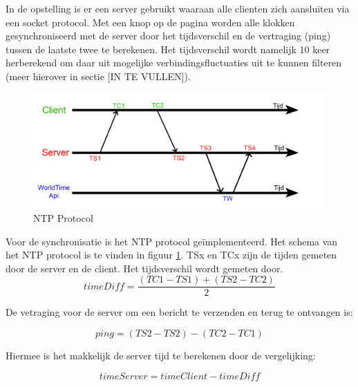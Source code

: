 In de opstelling is er een server gebruikt waaraan alle clienten zich aansluiten via een socket protocol. Met een knop op de pagina worden alle klokken gesynchroniseerd met de server door het tijdsverschil en de vertraging (ping) tussen de laatste twee te berekenen.
Het tijdsverschil wordt namelijk 10 keer herberekend om daar uit mogelijke verbindingsfluctuaties uit te kunnen filteren (meer hierover in sectie [IN TE VULLEN]).

\begin{figure}[h]
\centering
\includegraphics[scale=0.4]{img/server-client-sync.jpg}
\caption{NTP Protocol} \label{serv-client}
\end{figure}

Voor de synchronisatie is het NTP protocol geïmplementeerd. 
Het schema van het NTP protocol is te vinden in figuur \ref{serv-client}. TSx en TCx zijn de tijden gemeten door de server en de client.
Het tijdsverschil wordt gemeten door.
\newline
\[ timeDiff = \frac{(TC1 - TS1) + (TS2 - TC2)}{2}  \]

De vetraging voor de server om een bericht te verzenden en terug te ontvangen is:

\[ ping  = (TS2 - TS2) - (TC2 - TC1) \]


Hiermee is het makkelijk de server tijd te berekenen door de vergelijking:

\[ timeServer = timeClient - timeDiff \]


